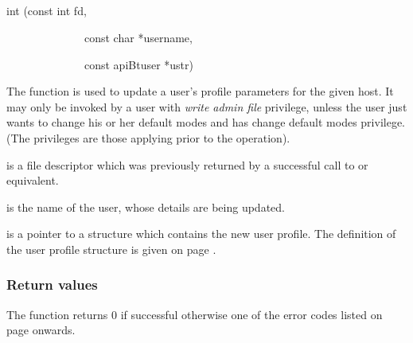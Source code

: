 \subsection{\funcnameXBputbtu{}}

\begin{expara}

int \funcnameXBputbtu{}(const int fd,

\ \ \ \ \ \ \ \ \ \ \ \ \ \ const char *username,

\ \ \ \ \ \ \ \ \ \ \ \ \ \ const apiBtuser *ustr)

\end{expara}

The function \funcXBputbtu{} is used to update a user's profile parameters for the given host. It may
only be invoked by a user with \textit{write admin file} privilege, unless the user just wants to change his or her default modes and has
change default modes privilege. (The privileges are those applying prior to the operation).

 is a file descriptor which was previously returned by a successful call to \funcXBopen{} or equivalent.

 is the name of the user, whose details are being updated.

 is a pointer to a structure which contains the new user profile. The definition of the user profile structure is
given on page \pageref{bkm:Userstructure}.

\subsubsection{Return values}
The function returns 0 if successful otherwise one of the error codes listed on page \pageref{errorcodes} onwards.

